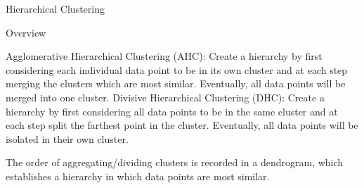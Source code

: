 \documentclass{beamer}
\begin{document}
\begin{frame}
    \begin{center}
      \textcolor{TennesseeOrange}{\huge Hierarchical Clustering}  
    \end{center}
\end{frame}
\begin{frame}{Overview}
    \begin{outline} %
        \1 Agglomerative Hierarchical Clustering (AHC): Create a hierarchy by first considering each individual data point to be in its own cluster and at each step merging the clusters which are most similar. Eventually, all data points will be merged into one cluster. 
        \1 Divisive Hierarchical Clustering (DHC): Create a hierarchy by first considering all data points to be in the same cluster and at each step split the farthest point in the cluster. Eventually, all data points will be isolated in their own cluster. 
    \end{outline}
    The order of aggregating/dividing clusters is recorded in a dendrogram, which establishes a hierarchy in which data points are most similar.
\end{frame}


\end{document}
